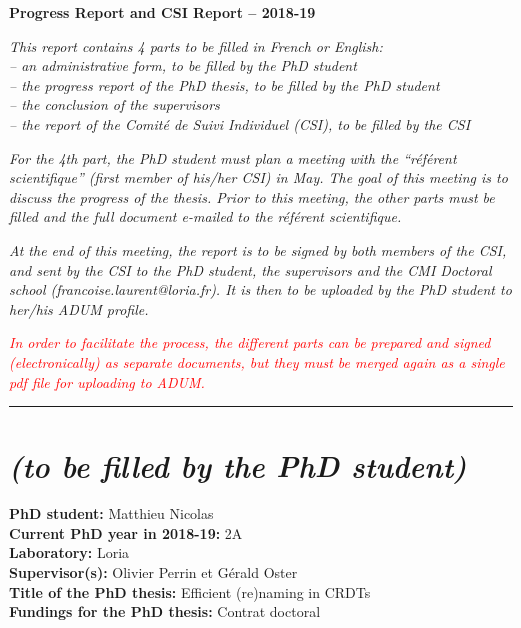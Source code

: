 \documentclass[12pt]{article}
\newcommand{\commentaire}[1]{\small\textit{#1}}
\begin{document}

\bigskip

\centerline{\Large\textbf{Progress Report and CSI Report -- 2018-19}}
\bigskip
\bigskip

\commentaire{%
This report contains 4 parts to be filled in French or English:\\
  -- an administrative form, to be filled by the PhD student\\
  -- the progress report of the PhD thesis, to be filled by the PhD
  student\\
  -- the conclusion of the supervisors\\
  -- the report of the Comit\'e de Suivi Individuel (CSI), to be
  filled by the CSI\\}

\commentaire{%
For the 4th part, the PhD student must plan a meeting with the
“r\'ef\'erent scientifique” (first member of his/her CSI) in May. The
goal of this meeting is to discuss the progress of the
thesis. Prior to this meeting, the other parts must be filled and
the full document e-mailed to the r\'ef\'erent scientifique.\\}

\commentaire{%
At the end of this meeting, the report is to be signed by both
members of the CSI, and sent by the CSI to the PhD student, the
supervisors and the CMI Doctoral school
(francoise.laurent@loria.fr). It is then to be uploaded by the PhD
student to her/his ADUM profile.\\}

\commentaire{%
\textcolor{red}{In order to facilitate the process, the different parts can be
prepared and signed (electronically) as separate documents, but
they must be merged again as a single pdf file for uploading to
ADUM.}}

\bigskip
\hrule

\section*{ \textit{\small (to be filled by the PhD student)}}

\noindent\textbf{PhD student:}
Matthieu Nicolas
\\
\noindent\textbf{Current PhD year in 2018-19:}
2A
\\
\noindent\textbf{Laboratory:}
Loria
\\
\noindent\textbf{Supervisor(s):}
Olivier Perrin et Gérald Oster
\\
\noindent\textbf{Title of the PhD thesis:}
Efficient (re)naming in \acp{CRDT}
\\
\noindent\textbf{Fundings for the PhD thesis:}
Contrat doctoral
\\
\end{document}
